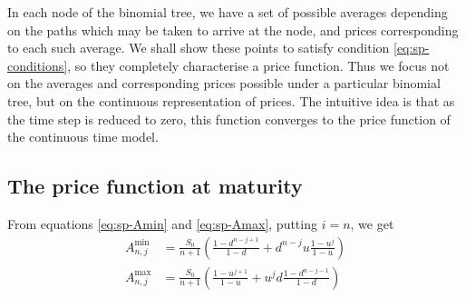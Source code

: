 In each node of the binomial tree, we have a set of possible averages depending on the paths which may be taken to arrive at the node, and prices corresponding to each such average. We shall show these points to satisfy condition \ref{eq:sp-conditions}, so they completely characterise a price function. Thus we focus not on the averages and corresponding prices possible under a particular binomial tree, but on the continuous representation of prices. The intuitive idea is that as the time step is reduced to zero, this function converges to the price function of the continuous time model.





\subsection{The price function at maturity}

From equations \ref{eq:sp-Amin} and \ref{eq:sp-Amax}, putting $i = n$, we get
\begin{align*}
	A_{n,j}^{\min} &= \frac{S_0}{n+1} \left( \frac{1 - d^{n-j+1}}{1-d} + d^{n-j} u \frac{1 - u^{j}}{1-u} \right) \\
	A_{n,j}^{\max} &= \frac{S_0}{n+1} \left( \frac{1 - u^{j+1}}{1-u} + u^{j} d \frac{1 - d^{n-j-1}}{1-d} \right)
\end{align*}

